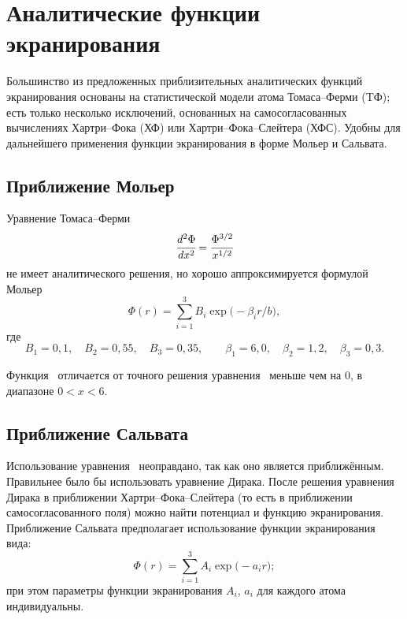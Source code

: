   \section{Аналитические функции экранирования}

  Большинство из предложенных приблизительных аналитических
  функций экранирования основаны на статистической модели
  атома Томаса--Ферми (TФ); есть только несколько исключений,
  основанных на самосогласованных вычислениях Хартри--Фока (ХФ)
  или Хартри--Фока--Слейтера (ХФС). Удобны для дальнейшего
  применения функции экранирования в форме Мольер и Сальвата.

  \subsection{Приближение Мольер}

  Уравнение Томаса--Ферми
  \begin{equation}
    \cfrac{d^2\Phi}{dx^2} = \cfrac{\Phi^{3/2}}{x^{1/2}}
    \label{eq:Thomas}
  \end{equation}
  не имеет аналитического  решения, но хорошо аппроксимируется
  формулой Мольер
  \begin{equation}
    \Phi(r)=\sum_{i=1}^3B_i\exp\bigl(-\beta_ir/b\big),
    \label{eq:Moliere}
  \end{equation}
  где
  \[
    B_1 = 0,\!1, \quad B_2 = 0,\!55, \quad B_3 = 0,\!35, \qquad
      \beta_1 = 6,\!0, \quad \beta_2 = 1,\!2, \quad \beta_3 = 0,\!3.
  \]

  Функция~ отличается от точного решения
  уравнения~ меньше чем на 0, в диапазоне
  \( 0 < x < 6 \).

  \subsection{Приближение Сальвата}

  Использование уравнения~ неоправдано, так как оно является
  приближённым. Правильнее было бы использовать уравнение Дирака.
  После решения уравнения Дирака в приближении Хартри--Фока--Слейтера
  (то есть в приближении самосогласованного поля) можно найти
  потенциал и функцию экранирования. Приближение Сальвата
  предполагает использование функции экранирования вида:
  \begin{equation}
    \Phi(r) = \sum_{i = 1}^3 A_i\exp\bigl(-a_ir\big);
    \label{eq:Salvat}
  \end{equation}
  при этом параметры функции экранирования \( A_i \), \( a_i \) для каждого
  атома индивидуальны.

